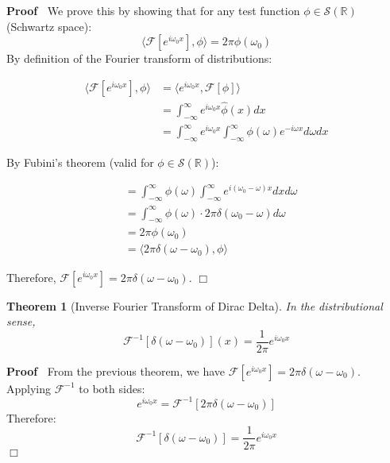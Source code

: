 \documentclass{article}
\newenvironment{proof}{\noindent\textbf{Proof\ }}{\hspace*{\fill}$\Box$\medskip}
\newtheorem{theorem}{Theorem}
\begin{document}
\begin{proof}
  We prove this by showing that for any test function $\phi \in \mathcal{S}
  (\mathbb{R})$ (Schwartz space):
  \[ \langle \mathcal{F}[e^{i \omega_0 x}], \phi \rangle = 2 \pi \phi
     (\omega_0) \]
  By definition of the Fourier transform of distributions:
  
  \begin{align}
    \langle \mathcal{F}[e^{i \omega_0 x}], \phi \rangle & = \langle e^{i
    \omega_0 x}, \mathcal{F}[\phi] \rangle \\
    & = \int_{- \infty}^{\infty} e^{i \omega_0 x}  \hat{\phi} (x) dx \\
    & = \int_{- \infty}^{\infty} e^{i \omega_0 x}  \int_{- \infty}^{\infty}
    \phi (\omega) e^{- i \omega x} d \omega dx 
  \end{align}
  
  By Fubini's theorem (valid for $\phi \in \mathcal{S} (\mathbb{R})$):
  
  \begin{align}
    & = \int_{- \infty}^{\infty} \phi (\omega)  \int_{- \infty}^{\infty} e^{i
    (\omega_0 - \omega) x} dxd \omega \\
    & = \int_{- \infty}^{\infty} \phi (\omega) \cdot 2 \pi \delta (\omega_0 -
    \omega) d \omega \\
    & = 2 \pi \phi (\omega_0) \\
    & = \langle 2 \pi \delta (\omega - \omega_0), \phi \rangle 
  \end{align}
  
  Therefore, $\mathcal{F} [e^{i \omega_0 x}] = 2 \pi \delta (\omega -
  \omega_0)$.
\end{proof}

\begin{theorem}
  [Inverse Fourier Transform of Dirac Delta] In the distributional sense,
  \[ \mathcal{F}^{- 1}  [\delta (\omega - \omega_0)] (x) = \frac{1}{2 \pi}
     e^{i \omega_0 x} \]
\end{theorem}

\begin{proof}
  From the previous theorem, we have $\mathcal{F} [e^{i \omega_0 x}] = 2 \pi
  \delta (\omega - \omega_0)$. Applying $\mathcal{F}^{- 1}$ to both sides:
  \[ e^{i \omega_0 x} =\mathcal{F}^{- 1}  [2 \pi \delta (\omega - \omega_0)]
  \]
  Therefore:
  \[ \mathcal{F}^{- 1}  [\delta (\omega - \omega_0)] = \frac{1}{2 \pi} e^{i
     \omega_0 x} \]
\end{proof}
\end{document}
